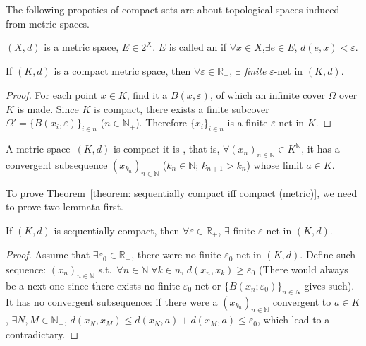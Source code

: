 \documentclass[openany]{book}
\begin{document}
The following propoties of compact sets are about topological spaces induced from metric spaces.

\begin{definition}[net]\label{defintion: e-net}
	$(X, d)$ is a metric space, $E \in 2^X$. 
	$E$ is called an  if $\forall x \in X$,$\exists e \in E$, $d(e, x) < \varepsilon$.
\end{definition}

\begin{theorem}\label{theorem: finite e-net exists (metric, compact)}
	If $(K, d)$ is a compact metric space, then $\forall \varepsilon \in \mathbb R_+$, $\exists$ \emph{finite} $\varepsilon$-net in $(K, d)$. 
\end{theorem}
\begin{proof}
	For each point $x\in K$, find it a $B(x,\varepsilon)$, of which an infinite cover $\Omega$ over $K$ is made. 
	Since $K$ is compact, there exists a finite subcover $\varOmega' = \{B(x_i,\varepsilon)\}_{i \in n}$ ($n \in \mathbb N_+$). Therefore $\{x_i\}_{i \in n}$ is a finite $\varepsilon$-net in $K$.
\end{proof}

\begin{theorem}\label{theorem: sequentially compact iff compact (metric)}
	A metric space~$(K, d)$ is compact  it is , 
	that is, $\forall (x_n)_{n \in \mathbb N} \in K^\mathbb N$, it has a convergent subsequence $(x_{k_n})_{n \in \mathbb N}$ 
		($k_n \in \mathbb N$; $k_{n+1} > k_n$)
	whose limit $a \in K$.
\end{theorem}

To prove Theorem~\ref{theorem: sequentially compact iff compact (metric)}, we need to prove two lemmata first.

\begin{lemma}\label{lemma: finite e-net exists (metric, sequentially compact)}
	If $(K, d)$ is sequentially compact, then $\forall \varepsilon \in \mathbb R_+$, $\exists$ finite $\varepsilon$-net in $(K, d)$. 
\end{lemma}
\begin{proof}
	Assume that $\exists \varepsilon_0 \in \mathbb R_+$, there were no finite  $\varepsilon_0$-net in $(K, d)$. 
	Define such sequence: $ (x_n)_{n \in \mathbb N}$ s.t.\ $\forall n \in \mathbb N \; \forall k \in n$, $d(x_n, x_k) \geq \varepsilon_0$ 
		(There would always be a next one since there exists no finite $\varepsilon_0$-net or $\{B(x_n; \varepsilon_0)\}_{n \in N}$ gives such). 
		It has no convergent subsequence: 
		if there were a $(x_{k_n})_{n \in \mathbb N}$ convergent to $a\in K$, $\exists N,M\in\mathbb{N}_+$, $d(x_N, x_M)\leq d(x_N, a)+d(x_M, a)\leq \varepsilon_0$, which lead to a contradictary. 
\end{proof}
\end{document}
